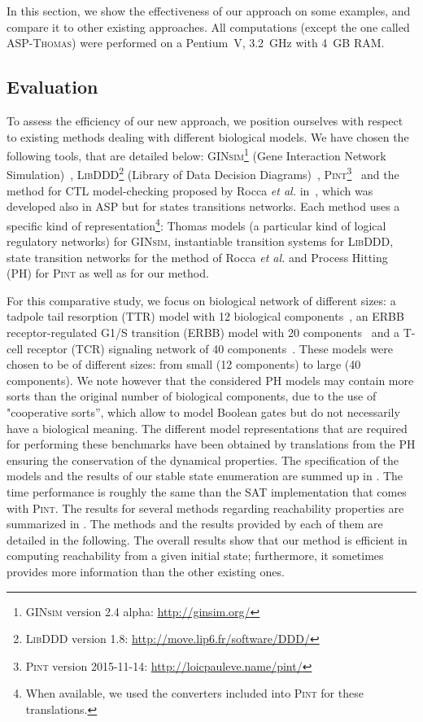 In this section, we show the effectiveness of our approach on some examples,
and compare it to other existing approaches.
All computations (except the one called \textsc{ASP-Thomas}) were performed on a Pentium~V, 3.2~GHz with 4~GB RAM.

\subsection{Evaluation}
To assess the efficiency of our new approach,
we position ourselves with respect to existing methods dealing with different biological models.
We have chosen the following tools, that are detailed below: 
\textsc{GINsim}\footnote{\textsc{GINsim} version 2.4 alpha: \url{http://ginsim.org/}} (Gene Interaction Network Simulation)~\cite{gonzalez2006ginsim,naldi2009logical,naldi2007decision},
\textsc{LibDDD}\footnote{\textsc{LibDDD} version 1.8: \url{http://move.lip6.fr/software/DDD/}}
(Library of Data Decision Diagrams)~\cite{thierry2009hierarchical,colange2013towards},
\textsc{Pint}\footnote{\textsc{Pint} version 2015-11-14: \url{http://loicpauleve.name/pint/}}~\cite{PMR12-MSCS}
and the method for CTL model-checking proposed by Rocca \textit{et al.} in~\cite{roccaasp},
which was developed also in ASP but for states transitions networks.
Each method uses a specific kind of representation\footnote{When available, we used the converters included into \textsc{Pint} for these translations.}:
Thomas models (a particular kind of logical regulatory networks) for \textsc{GINsim},
instantiable transition systems for \textsc{LibDDD},
state transition networks for the method of Rocca \textit{et al.}
and Process Hitting (PH) for \textsc{Pint} as well as for our method.

For this comparative study, we focus on biological network of different sizes:
a tadpole tail resorption (TTR) model with 12 biological components~\cite{khalis2009smbionet},
an ERBB receptor-regulated G1/S transition (ERBB) model with 20 components~\cite{Samaga2009}
and a T-cell receptor (TCR) signaling network of 40 components~\cite{Klamt06}.
These models were chosen to be of different sizes:
from small (12 components) to large (40 components).
We note however that the considered PH models may contain more sorts than
the original number of biological components, due to the use of
"cooperative sorts'', which allow to model Boolean gates but do not necessarily
have a biological meaning.
The different model representations that are required for performing these benchmarks have been obtained by translations
from the PH
ensuring the conservation of the dynamical properties.
The specification of the models and the results of our stable state enumeration
are summed up in .
The time performance is roughly the same than the SAT implementation
that comes with \textsc{Pint}.
The results for several methods regarding reachability properties
are summarized in .
The methods and the results provided by each of them are detailed in the following.
The overall results show that our method is efficient in computing reachability
from a given initial state;
furthermore, it sometimes provides more information than the other existing ones.

